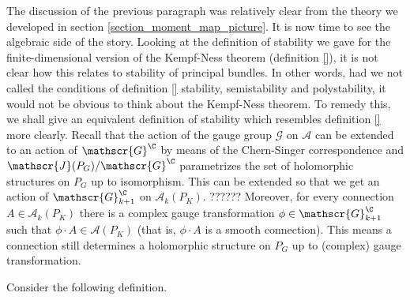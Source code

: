 {The discussion of the previous paragraph was relatively clear from the theory we developed in section \ref{section_moment_map_picture}. It is now time to see the algebraic side of the story. Looking at the definition of stability we gave for the finite-dimensional version of the Kempf-Ness theorem (definition \ref{}), it is not clear how this relates to stability of principal bundles. In other words, had we not called the conditions of definition \ref{} stability, semistability and polystability, it would not be obvious to think about the Kempf-Ness theorem. To remedy this, we shall give an equivalent definition of stability which resembles definition \ref{} more clearly. Recall that the action of the gauge group \(\mathscr{G}\) on \(\mathscr{A}\) can be extended to an action of \(\mathscr{G}^\C\) by means of the Chern-Singer correspondence and \(\mathscr{J}(P_G)/\mathscr{G}^\C\) parametrizes the set of holomorphic structures on \(P_G\) up to isomorphism. This can be extended so that we get an action of \(\mathscr{G}^\C_{k+1}\) on \(\mathscr{A}_k(P_K)\). {\color{red}??????} Moreover, for every connection \(A \in \mathscr{A}_k(P_K)\) there is a complex gauge transformation \(\phi \in \mathscr{G}^\C_{k+1}\) such that \(\phi\cdot A \in \mathscr{A}(P_K)\) (that is, \(\phi\cdot A\) is a smooth connection). This means {\color{red} a connection still determines a holomorphic structure on \(P_G\) up to (complex) gauge transformation.} \newline \newline

Consider the following definition.

}

